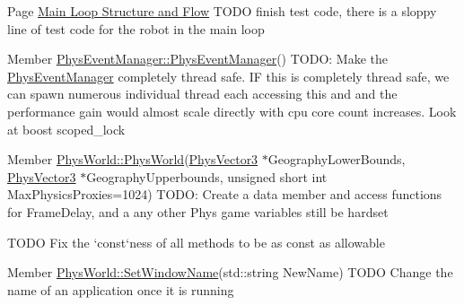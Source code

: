 \label{todo__todo000009}
\hypertarget{todo__todo000009}{}
 
\begin{DoxyDescription}
\item[Page \hyperlink{mainloop1}{Main Loop Structure and Flow} ]TODO finish test code, there is a sloppy line of test code for the robot in the main loop 
\end{DoxyDescription}

\label{todo__todo000003}
\hypertarget{todo__todo000003}{}
 
\begin{DoxyDescription}
\item[Member \hyperlink{classPhysEventManager_a217e7f6006aaf5e08e2872fa4d66e5e2}{PhysEventManager::PhysEventManager}() ]TODO: Make the \hyperlink{classPhysEventManager}{PhysEventManager} completely thread safe. IF this is completely thread safe, we can spawn numerous individual thread each accessing this and and the performance gain would almost scale directly with cpu core count increases. Look at boost scoped\_\-lock 
\end{DoxyDescription}

\label{todo__todo000011}
\hypertarget{todo__todo000011}{}
 
\begin{DoxyDescription}
\item[Member \hyperlink{classPhysWorld_a3228c98369082139722d3c918d735e6c}{PhysWorld::PhysWorld}(\hyperlink{classPhysVector3}{PhysVector3} $\ast$GeographyLowerBounds, \hyperlink{classPhysVector3}{PhysVector3} $\ast$GeographyUpperbounds, unsigned short int MaxPhysicsProxies=1024) ]TODO: Create a data member and access functions for FrameDelay, and a any other Phys game variables still be hardset 

TODO Fix the `const`ness of all methods to be as const as allowable 
\end{DoxyDescription}

\label{todo__todo000010}
\hypertarget{todo__todo000010}{}
 
\begin{DoxyDescription}
\item[Member \hyperlink{classPhysWorld_adb5ba2b5a3140c5d7033d3180e3f7342}{PhysWorld::SetWindowName}(std::string NewName) ]TODO Change the name of an application once it is running 
\end{DoxyDescription}